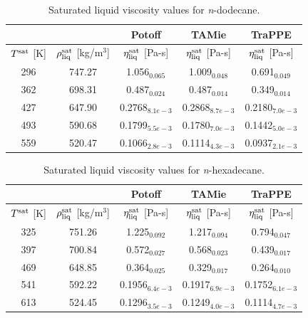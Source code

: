 \documentclass[preprint,review,12pt]{elsarticle}
\begin{document}
	\begin{table}[h!]
		\caption{Saturated liquid viscosity values for \textit{n}-dodecane.}
		\begin{center}
			\begin{tabular}{|c|c|c|c|c|}
				\hline
				&                                       & Potoff            & TAMie             & TraPPE            \\ \hline
				$T^{\rm sat}$ {[}K{]} & $\rho^{\rm sat}_{\rm liq}$ [kg/m$^3$] & $\eta_{\rm liq}^{\rm sat}$ {[}Pa-s{]} & $\eta_{\rm liq}^{\rm sat}$ {[}Pa-s{]} & $\eta_{\rm liq}^{\rm sat}$ {[}Pa-s{]} \\ \hline
				296 & 747.27 & 1.056$_{0.065}$   & 1.009$_{0.048}$   & 0.691$_{0.049}$   \\ \hline
				362 & 698.31 & 0.487$_{0.024}$   & 0.487$_{0.014}$   & 0.349$_{0.014}$   \\ \hline
				427 & 647.90 & 0.2768$_{8.1e-3}$ & 0.2868$_{8.7e-3}$ & 0.2180$_{7.0e-3}$ \\ \hline
				493 & 590.68 & 0.1799$_{5.5e-3}$ & 0.1780$_{7.0e-3}$ & 0.1442$_{5.0e-3}$ \\ \hline
				559 & 520.47 & 0.1066$_{2.8e-3}$ & 0.1114$_{4.3e-3}$ & 0.0937$_{2.1e-3}$ \\ \hline
			\end{tabular}
		\end{center}
	\end{table}
	
	\begin{table}[h!]
		\caption{Saturated liquid viscosity values for \textit{n}-hexadecane.}
		\begin{center}
			\begin{tabular}{|c|c|c|c|c|}
				\hline
				&                                       & Potoff            & TAMie             & TraPPE            \\ \hline
				$T^{\rm sat}$ {[}K{]} & $\rho^{\rm sat}_{\rm liq}$ [kg/m$^3$] & $\eta_{\rm liq}^{\rm sat}$ {[}Pa-s{]} & $\eta_{\rm liq}^{\rm sat}$ {[}Pa-s{]} & $\eta_{\rm liq}^{\rm sat}$ {[}Pa-s{]} \\ \hline
				325 & 751.26 & 1.225$_{0.092}$   & 1.217$_{0.094}$   & 0.794$_{0.047}$   \\ \hline
				397 & 700.84 & 0.572$_{0.027}$   & 0.568$_{0.023}$   & 0.439$_{0.017}$   \\ \hline
				469 & 648.85 & 0.364$_{0.025}$   & 0.329$_{0.017}$   & 0.264$_{0.010}$   \\ \hline
				541 & 592.22 & 0.1956$_{6.4e-3}$ & 0.1917$_{6.9e-3}$ & 0.1752$_{6.1e-3}$ \\ \hline
				613 & 524.45 & 0.1296$_{3.5e-3}$ & 0.1249$_{4.0e-3}$ & 0.1114$_{4.7e-3}$ \\ \hline
			\end{tabular}
		\end{center}
	\end{table}
	
\end{document}
